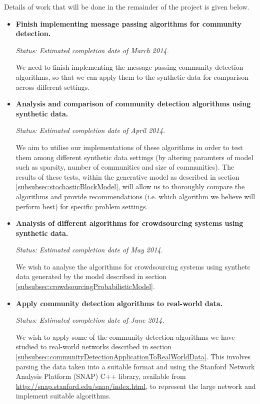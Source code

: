 \documentclass[12pt]{article}
\numberwithin{equation}{section}
\begin{document}
Details of work that will be done in the remainder of the project is given below.
\begin{itemize}
	\item \textbf{Finish implementing message passing algorithms for community detection.}

	\textit{Status: Estimated completion date of March 2014.}	

	We need to finish implementing the message passing community detection algorithms, so that we can apply them to the synthetic data for comparison across different settings.

	\item \textbf{Analysis and comparison of community detection algorithms using synthetic data.}

	\textit{Status: Estimated completion date of April 2014.}	

	We aim to utilise our implementations of these algorithms in order to test them among different synthetic data settings (by altering paramters of model such as sparsity, number of communities and size of communities). The results of these tests, within the generative model as described in section \ref{subsubsec:stochasticBlockModel}, will allow us to thoroughly compare the algorithms and provide recommendations (i.e. which algorithm we believe will perform best) for specific problem settings.

	\item \textbf{Analysis of different algorithms for crowdsourcing systems using synthetic data.}

	\textit{Status: Estimated completion date of May 2014.}	

	We wish to analyse the algorithms for crowdsourcing systems using synthetc data generated by the model described in section \ref{subsubsec:crowdsourcingProbabilisticModel}.

	\item \textbf{Apply community detection algorithms to real-world data.}

	\textit{Status: Estimated completion date of June 2014.}	

	We wish to apply some of the community detection algorithms we have studied to real-world networks described in section \ref{subsubsec:communityDetectionApplicationToRealWorldData}. This involves parsing the data taken into a suitable format and using the Stanford Network Analysis Platform (SNAP) C++ library, available from \url{http://snap.stanford.edu/snap/index.html}, to represent the large network and implement suitable algorithms.
\end{itemize}
\end{document}
